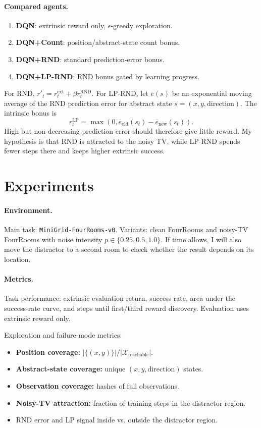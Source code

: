 \documentclass{article}
\begin{document}
\paragraph{Compared agents.}
\begin{enumerate}
    \item \textbf{DQN}: extrinsic reward only, $\epsilon$-greedy exploration.
    \item \textbf{DQN+Count}: position/abstract-state count bonus.
    \item \textbf{DQN+RND}: standard prediction-error bonus.
    \item \textbf{DQN+LP-RND}: RND bonus gated by learning progress.
\end{enumerate}

For RND, $r'_t=r^{\mathrm{ext}}_t+\beta r^{\mathrm{RND}}_t$. For LP-RND, let $\bar e(s)$ be an exponential moving average of the RND prediction error for abstract state $s=(x,y,\mathrm{direction})$. The intrinsic bonus is
\begin{equation}
    r^{\mathrm{LP}}_t = \max(0, \bar e_{\mathrm{old}}(s_t)-\bar e_{\mathrm{new}}(s_t)).
\end{equation}
High but non-decreasing prediction error should therefore give little reward. My hypothesis is that RND is attracted to the noisy TV, while LP-RND spends fewer steps there and keeps higher extrinsic success.

\section{Experiments}
\paragraph{Environment.}
Main task: \texttt{MiniGrid-FourRooms-v0}. Variants: clean FourRooms and noisy-TV FourRooms with noise intensity $p\in\{0.25,0.5,1.0\}$. If time allows, I will also move the distractor to a second room to check whether the result depends on its location.

\paragraph{Metrics.}
Task performance: extrinsic evaluation return, success rate, area under the success-rate curve, and steps until first/third reward discovery. Evaluation uses extrinsic reward only.

Exploration and failure-mode metrics:
\begin{itemize}
    \item \textbf{Position coverage:} $|\{(x,y)\}|/|\mathcal X_{\mathrm{reachable}}|$.
    \item \textbf{Abstract-state coverage:} unique $(x,y,\mathrm{direction})$ states.
    \item \textbf{Observation coverage:} hashes of full observations.
    \item \textbf{Noisy-TV attraction:} fraction of training steps in the distractor region.
    \item RND error and LP signal inside vs. outside the distractor region.
\end{itemize}
\end{document}

